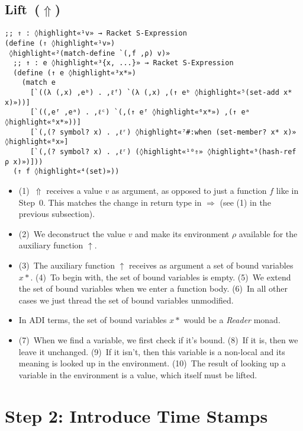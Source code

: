\documentclass[12pt, oneside]{book}
\begin{document}
\subsection{Lift~(\(⇑\))}

\begin{Verbatim}
;; ⇑ : ◊highlight«¹v» → Racket S-Expression
(define (⇑ ◊highlight«¹v»)
 ◊highlight«²(match-define `(,f ,ρ) v)»
  ;; ↑ : e ◊highlight«³{x, ...}» → Racket S-Expression
  (define (↑ e ◊highlight«³x*»)
    (match e
      [`((λ (,x) ,eᵇ) . ,ℓᶠ) `(λ (,x) ,(↑ eᵇ ◊highlight«⁵(set-add x* x)»))]
      [`((,eᶠ ,eᵃ) . ,ℓᶜ) `(,(↑ eᶠ ◊highlight«⁶x*») ,(↑ eᵃ ◊highlight«⁶x*»))]
      [`(,(? symbol? x) . ,ℓʳ) ◊highlight«⁷#:when (set-member? x* x)» ◊highlight«⁸x»]
      [`(,(? symbol? x) . ,ℓʳ) (◊highlight«¹⁰⇑» ◊highlight«⁹(hash-ref ρ x)»)]))
  (↑ f ◊highlight«⁴(set)»))
\end{Verbatim}

\begin{itemize}
  \item (1)~\(⇑\) receives a value \(v\) as argument, as opposed to just a function \(f\) like in Step~0. This matches the change in return type in \(⇒\) (see (1) in the previous subsection).
  \item (2)~We deconstruct the value \(v\) and make its environment \(ρ\) available for the auxiliary function \(↑\).
  \item (3)~The auxiliary function \(↑\) receives as argument a set of bound variables \(x*\). (4)~To begin with, the set of bound variables is empty. (5)~We extend the set of bound variables when we enter a function body. (6)~In all other cases we just thread the set of bound variables unmodified.
  \item In ADI terms, the set of bound variables \(x*\) would be a \emph{Reader} monad.
  \item (7)~When we find a variable, we first check if it’s bound. (8)~If it is, then we leave it unchanged. (9)~If it isn’t, then this variable is a non-local and its meaning is looked up in the environment. (10)~The result of looking up a variable in the environment is a value, which itself must be lifted.
\end{itemize}

\section{Step 2: Introduce Time Stamps}
\end{document}

